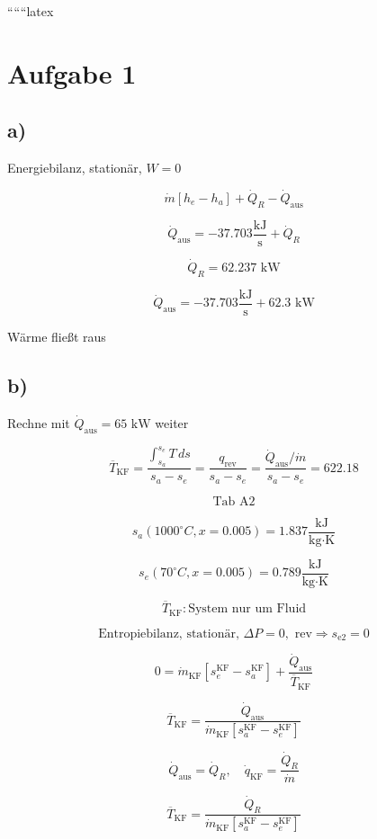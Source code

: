 
``````latex


\section*{Aufgabe 1}

\subsection*{a)}
Energiebilanz, stationär, \( W = 0 \)

\[
\dot{m} \left[ h_e - h_a \right] + \dot{Q}_R - \dot{Q}_{\text{aus}}
\]

\[
\dot{Q}_{\text{aus}} = -37.703 \frac{\text{kJ}}{\text{s}} + \dot{Q}_R
\]

\[
\dot{Q}_R = 62.237 \text{ kW}
\]

\[
\dot{Q}_{\text{aus}} = -37.703 \frac{\text{kJ}}{\text{s}} + 62.3 \text{ kW}
\]

Wärme fließt raus

\subsection*{b)}
Rechne mit \(\dot{Q}_{\text{aus}} = 65 \text{ kW} \) weiter

\[
\overline{T}_{\text{KF}} = \frac{\int_{s_a}^{s_e} T \, ds}{s_a - s_e} = \frac{q_{\text{rev}}}{s_a - s_e} = \frac{\dot{Q}_{\text{aus}} / \dot{m}}{s_a - s_e} = 622.18
\]

\[
\text{Tab A2}
\]

\[
s_a (1000^\circ C, x = 0.005) = 1.837 \frac{\text{kJ}}{\text{kg} \cdot \text{K}}
\]

\[
s_e (70^\circ C, x = 0.005) = 0.789 \frac{\text{kJ}}{\text{kg} \cdot \text{K}}
\]

\[
\overline{T}_{\text{KF}} : \text{System nur um Fluid}
\]

\[
\text{Entropiebilanz, stationär, } \Delta P = 0, \text{ rev} \Rightarrow s_{\text{e2}} = 0
\]

\[
0 = \dot{m}_{\text{KF}} \left[ s_e^{\text{KF}} - s_a^{\text{KF}} \right] + \frac{\dot{Q}_{\text{aus}}}{\overline{T}_{\text{KF}}}
\]

\[
\overline{T}_{\text{KF}} = \frac{\dot{Q}_{\text{aus}}}{\dot{m}_{\text{KF}} \left[ s_a^{\text{KF}} - s_e^{\text{KF}} \right]}
\]

\[
\dot{Q}_{\text{aus}} = \dot{Q}_R, \quad \dot{q}_{\text{KF}} = \frac{\dot{Q}_R}{\dot{m}}
\]

\[
\overline{T}_{\text{KF}} = \frac{\dot{Q}_R}{\dot{m}_{\text{KF}} \left[ s_a^{\text{KF}} - s_e^{\text{KF}} \right]}
\]

